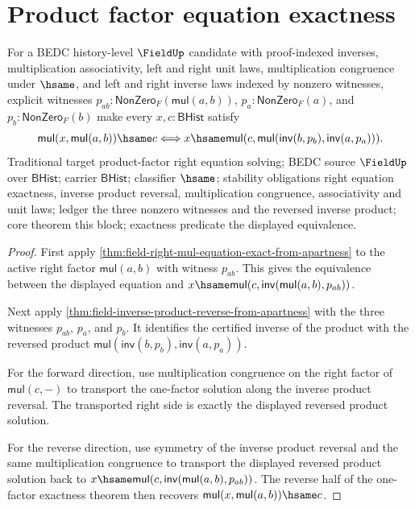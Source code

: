 \section{Product factor equation exactness}
\label{sec:field-product-right-equation-exactness}

\begin{theorem}
\label{thm:field-product-right-mul-equation-exact-from-apartness}
For a BEDC history-level $\FieldUp$ candidate with proof-indexed inverses,
multiplication associativity, left and right unit laws, multiplication
congruence under $\hsame$, and left and right inverse laws indexed by nonzero
witnesses, explicit witnesses
$p_{ab}:\mathsf{NonZero}_F(\mathsf{mul}(a,b))$,
$p_a:\mathsf{NonZero}_F(a)$, and $p_b:\mathsf{NonZero}_F(b)$ make every
$x,c:\mathsf{BHist}$ satisfy
$$
\mathsf{mul}(x,\mathsf{mul}(a,b))\hsame c
\Longleftrightarrow
x\hsame \mathsf{mul}(c,\mathsf{mul}(\mathsf{inv}(b,p_b),\mathsf{inv}(a,p_a))).
$$
Traditional target product-factor right equation solving; BEDC source
$\FieldUp$ over $\mathsf{BHist}$; carrier $\mathsf{BHist}$; classifier
$\hsame$; stability obligations right equation exactness, inverse product
reversal, multiplication congruence, associativity and unit laws; ledger the
three nonzero witnesses and the reversed inverse product; core theorem this
block; exactness predicate the displayed equivalence.
\end{theorem}
\begin{proof}
First apply
\autoref{thm:field-right-mul-equation-exact-from-apartness} to the active
right factor $\mathsf{mul}(a,b)$ with witness $p_{ab}$. This gives the
equivalence between the displayed equation and
$x\hsame\mathsf{mul}(c,\mathsf{inv}(\mathsf{mul}(a,b),p_{ab}))$.

Next apply
\autoref{thm:field-inverse-product-reverse-from-apartness} with the three
witnesses $p_{ab}$, $p_a$, and $p_b$. It identifies the certified inverse of
the product with the reversed product
$\mathsf{mul}(\mathsf{inv}(b,p_b),\mathsf{inv}(a,p_a))$.

For the forward direction, use multiplication congruence on the right factor
of $\mathsf{mul}(c,-)$ to transport the one-factor solution along the inverse
product reversal. The transported right side is exactly the displayed reversed
product solution.

For the reverse direction, use symmetry of the inverse product reversal and
the same multiplication congruence to transport the displayed reversed product
solution back to
$x\hsame\mathsf{mul}(c,\mathsf{inv}(\mathsf{mul}(a,b),p_{ab}))$. The reverse
half of the one-factor exactness theorem then recovers
$\mathsf{mul}(x,\mathsf{mul}(a,b))\hsame c$.
\end{proof}

